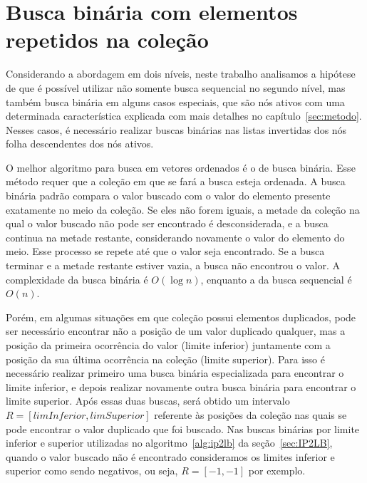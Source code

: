 \section{Busca binária com elementos repetidos na coleção}
\label{sec:binary_search_with_duplicates}

Considerando a abordagem em dois níveis, neste trabalho analisamos a hipótese de que é possível utilizar não somente busca sequencial no segundo nível, mas também busca binária em alguns casos especiais, que são nós ativos com uma determinada característica explicada com mais detalhes no capítulo~\ref{sec:metodo}. Nesses casos, é necessário realizar buscas binárias nas listas invertidas dos nós folha descendentes dos nós ativos.

O melhor algoritmo para busca em vetores ordenados é o de busca binária. Esse método requer que a coleção em que se fará a busca esteja ordenada. A busca binária padrão compara o valor buscado com o valor do elemento presente exatamente no meio da coleção. Se eles não forem iguais, a metade da coleção na qual o valor buscado não pode ser encontrado é desconsiderada, e a busca continua na metade restante, considerando novamente o valor do elemento do meio. Esse processo se repete até que o valor seja encontrado. Se a busca terminar e a metade restante estiver vazia, a busca não encontrou o valor. A complexidade da busca binária é $O(\log n)$, enquanto a da busca sequencial é $O(n)$.

Porém, em algumas situações em que coleção possui elementos duplicados, pode ser necessário encontrar não a posição de um valor duplicado qualquer, mas a posição da primeira ocorrência do valor (limite inferior) juntamente com a posição da sua última ocorrência na coleção (limite superior). Para isso é necessário realizar primeiro uma busca binária especializada para encontrar o limite inferior, e depois realizar novamente outra busca binária para encontrar o limite superior. Após essas duas buscas, será obtido um intervalo $R = [limInferior, limSuperior]$ referente às posições da coleção nas quais se pode encontrar o valor duplicado que foi buscado. Nas buscas binárias por limite inferior e superior utilizadas no algoritmo~\ref{alg:ip2lb} da seção~\ref{sec:IP2LB}, quando o valor buscado não é encontrado consideramos os limites inferior e superior como sendo negativos, ou seja, $R = [-1, -1]$ por exemplo.